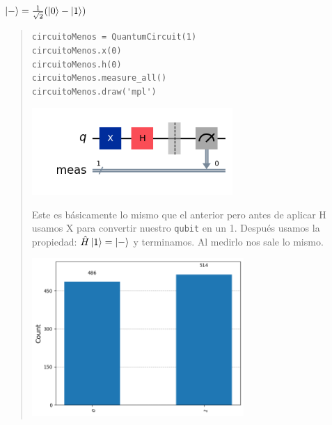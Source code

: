 \textbf{$\ket{-} = \frac{1}{\sqrt{2}}(\ket{0}-\ket{1})$}\vspace{.2cm}
\textcolor{bibi}{}
\begin{quote}
    \begin{verbatim}
circuitoMenos = QuantumCircuit(1)
circuitoMenos.x(0)
circuitoMenos.h(0)
circuitoMenos.measure_all()
circuitoMenos.draw('mpl')
    \end{verbatim}
    \vspace{.3cm}
    \begin{center}
        \includegraphics[height=3.3cm]{src/Img/1.3.png}
    \end{center}

    Este es básicamente lo mismo que el anterior pero antes de aplicar H usamos X para
    convertir nuestro \texttt{qubit} en un 1. Después usamos la propiedad: 
    $\hat{H}\ket{1}=\ket{-}$ y terminamos. Al medirlo nos sale lo mismo. 
    \vspace{.5cm}

    \begin{center}
        \includegraphics[height=6cm]{src/Img/1.3.r.png}
    \end{center}
\end{quote}
